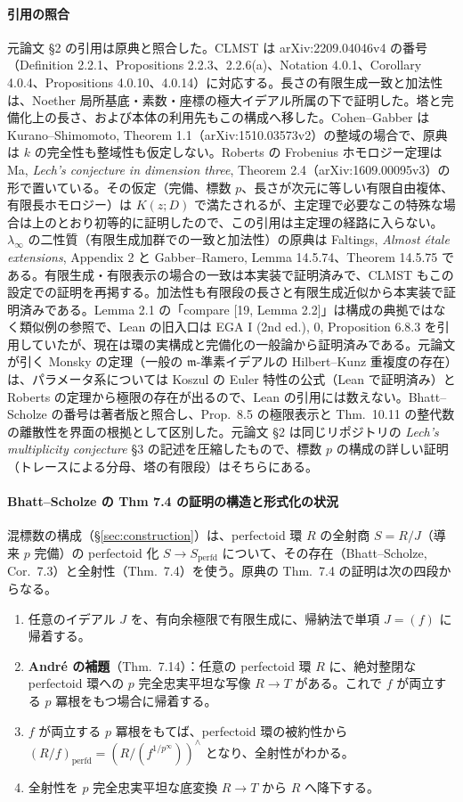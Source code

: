 \documentclass[11pt,a4paper]{ltjsarticle}
\numberwithin{equation}{section}
\theoremstyle{plain}
\theoremstyle{definition}
\theoremstyle{definition}
\newcommand{\m}{\mathfrak{m}}
\begin{document}
\paragraph{引用の照合}
元論文 §2 の引用は原典と照合した。CLMST は arXiv:2209.04046v4 の番号（Definition 2.2.1、Propositions 2.2.3、2.2.6(a)、Notation 4.0.1、Corollary 4.0.4、Propositions 4.0.10、4.0.14）に対応する。長さの有限生成一致と加法性は、Noether 局所基底・素数・座標の極大イデアル所属の下で証明した。塔と完備化上の長さ、および本体の利用先もこの構成へ移した。Cohen--Gabber は Kurano--Shimomoto, Theorem 1.1（arXiv:1510.03573v2）の整域の場合で、原典は $k$ の完全性も整域性も仮定しない。Roberts の Frobenius ホモロジー定理は Ma, \emph{Lech's conjecture in dimension three}, Theorem 2.4（arXiv:1609.00095v3）の形で置いている。その仮定（完備、標数 $p$、長さが次元に等しい有限自由複体、有限長ホモロジー）は $K(z;D)$ で満たされるが、主定理で必要なこの特殊な場合は上のとおり初等的に証明したので、この引用は主定理の経路に入らない。$\lambda_\infty$ の二性質（有限生成加群での一致と加法性）の原典は Faltings, \emph{Almost étale extensions}, Appendix 2 と Gabber--Ramero, Lemma 14.5.74、Theorem 14.5.75 である。有限生成・有限表示の場合の一致は本実装で証明済みで、CLMST もこの設定での証明を再掲する。加法性も有限段の長さと有限生成近似から本実装で証明済みである。Lemma 2.1 の「compare [19, Lemma 2.2]」は構成の典拠ではなく類似例の参照で、Lean の旧入口は EGA I (2nd ed.), 0, Proposition 6.8.3 を引用していたが、現在は環の実構成と完備化の一般論から証明済みである。元論文が引く Monsky の定理（一般の $\m$-準素イデアルの Hilbert--Kunz 重複度の存在）は、パラメータ系については Koszul の Euler 特性の公式（Lean で証明済み）と Roberts の定理から極限の存在が出るので、Lean の引用には数えない。Bhatt--Scholze の番号は著者版と照合し、Prop.~8.5 の極限表示と Thm.~10.11 の整代数の離散性を界面の根拠として区別した。元論文 §2 は同じリポジトリの \emph{Lech's multiplicity conjecture} §3 の記述を圧縮したもので、標数 $p$ の構成の詳しい証明（トレースによる分母、塔の有限段）はそちらにある。

\paragraph{Bhatt--Scholze の Thm 7.4 の証明の構造と形式化の状況}\label{par:bs-thm74}
混標数の構成（§\ref{sec:construction}）は、perfectoid 環 $R$ の全射商 $S=R/J$（導来 $p$ 完備）の perfectoid 化 $S\to S_{\mathrm{perfd}}$ について、その存在（Bhatt--Scholze, Cor.~7.3）と全射性（Thm.~7.4）を使う。原典の Thm.~7.4 の証明は次の四段からなる。
\begin{enumerate}
  \item 任意のイデアル $J$ を、有向余極限で有限生成に、帰納法で単項 $J=(f)$ に帰着する。
  \item \textbf{André の補題}（Thm.~7.14）：任意の perfectoid 環 $R$ に、絶対整閉な perfectoid 環への $p$ 完全忠実平坦な写像 $R\to T$ がある。これで $f$ が両立する $p$ 冪根をもつ場合に帰着する。
  \item $f$ が両立する $p$ 冪根をもてば、perfectoid 環の被約性から $(R/f)_{\mathrm{perfd}}=(R/(f^{1/p^\infty}))^\wedge$ となり、全射性がわかる。
  \item 全射性を $p$ 完全忠実平坦な底変換 $R\to T$ から $R$ へ降下する。
\end{enumerate}
\end{document}
